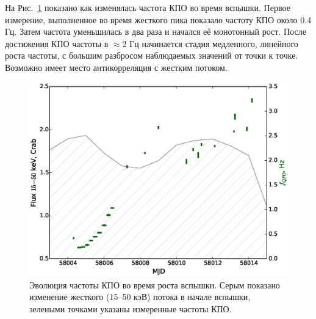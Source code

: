 \documentclass{pazhb}
\begin{document}
На Рис.~\ref{fig:qpoevol} показано как изменялась частота КПО во время вспышки. Первое измерение, выполненное во время жесткого пика показало частоту КПО около 0.4 Гц. Затем частота уменьшилась в два раза и начался её монотонный рост. После достижения КПО частоты в $\approx2$ Гц начинается стадия медленного, линейного роста частоты, с большим разбросом наблюдаемых значений от точки к точке. Возможно имеет место антикорреляция с жестким потоком.

\begin{figure}
\centerline{\includegraphics[width=\linewidth]{QPO_evo_v03.eps}}
\caption{Эволюция частоты КПО во время роста вспышки. Серым показано изменение жесткого (15--50 кэВ) потока в начале вспышки, зелеными точками указаны измеренные частоты КПО.}
\label{fig:qpoevol}
\end{figure}
\end{document}
